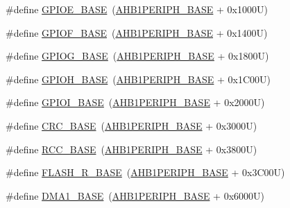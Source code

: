 \begin{DoxyCompactItemize}
\item 
\#define \hyperlink{group___peripheral__registers__structures_gab487b1983d936c4fee3e9e88b95aad9d}{G\+P\+I\+O\+E\+\_\+\+B\+A\+SE}~(\hyperlink{group___peripheral__memory__map_ga811a9a4ca17f0a50354a9169541d56c4}{A\+H\+B1\+P\+E\+R\+I\+P\+H\+\_\+\+B\+A\+SE} + 0x1000\+U)
\item 
\#define \hyperlink{group___peripheral__registers__structures_ga7f9a3f4223a1a784af464a114978d26e}{G\+P\+I\+O\+F\+\_\+\+B\+A\+SE}~(\hyperlink{group___peripheral__memory__map_ga811a9a4ca17f0a50354a9169541d56c4}{A\+H\+B1\+P\+E\+R\+I\+P\+H\+\_\+\+B\+A\+SE} + 0x1400\+U)
\item 
\#define \hyperlink{group___peripheral__registers__structures_ga5d8ca4020f2e8c00bde974e8e7c13cfe}{G\+P\+I\+O\+G\+\_\+\+B\+A\+SE}~(\hyperlink{group___peripheral__memory__map_ga811a9a4ca17f0a50354a9169541d56c4}{A\+H\+B1\+P\+E\+R\+I\+P\+H\+\_\+\+B\+A\+SE} + 0x1800\+U)
\item 
\#define \hyperlink{group___peripheral__registers__structures_gaee4716389f3a1c727495375b76645608}{G\+P\+I\+O\+H\+\_\+\+B\+A\+SE}~(\hyperlink{group___peripheral__memory__map_ga811a9a4ca17f0a50354a9169541d56c4}{A\+H\+B1\+P\+E\+R\+I\+P\+H\+\_\+\+B\+A\+SE} + 0x1\+C00\+U)
\item 
\#define \hyperlink{group___peripheral__registers__structures_ga50acf918c2e1c4597d5ccfe25eb3ad3d}{G\+P\+I\+O\+I\+\_\+\+B\+A\+SE}~(\hyperlink{group___peripheral__memory__map_ga811a9a4ca17f0a50354a9169541d56c4}{A\+H\+B1\+P\+E\+R\+I\+P\+H\+\_\+\+B\+A\+SE} + 0x2000\+U)
\item 
\#define \hyperlink{group___peripheral__registers__structures_ga656a447589e785594cbf2f45c835ad7e}{C\+R\+C\+\_\+\+B\+A\+SE}~(\hyperlink{group___peripheral__memory__map_ga811a9a4ca17f0a50354a9169541d56c4}{A\+H\+B1\+P\+E\+R\+I\+P\+H\+\_\+\+B\+A\+SE} + 0x3000\+U)
\item 
\#define \hyperlink{group___peripheral__registers__structures_ga0e681b03f364532055d88f63fec0d99d}{R\+C\+C\+\_\+\+B\+A\+SE}~(\hyperlink{group___peripheral__memory__map_ga811a9a4ca17f0a50354a9169541d56c4}{A\+H\+B1\+P\+E\+R\+I\+P\+H\+\_\+\+B\+A\+SE} + 0x3800\+U)
\item 
\#define \hyperlink{group___peripheral__registers__structures_ga8e21f4845015730c5731763169ec0e9b}{F\+L\+A\+S\+H\+\_\+\+R\+\_\+\+B\+A\+SE}~(\hyperlink{group___peripheral__memory__map_ga811a9a4ca17f0a50354a9169541d56c4}{A\+H\+B1\+P\+E\+R\+I\+P\+H\+\_\+\+B\+A\+SE} + 0x3\+C00\+U)
\item 
\#define \hyperlink{group___peripheral__registers__structures_gab2d8a917a0e4ea99a22ac6ebf279bc72}{D\+M\+A1\+\_\+\+B\+A\+SE}~(\hyperlink{group___peripheral__memory__map_ga811a9a4ca17f0a50354a9169541d56c4}{A\+H\+B1\+P\+E\+R\+I\+P\+H\+\_\+\+B\+A\+SE} + 0x6000\+U)

\end{DoxyCompactItemize}
